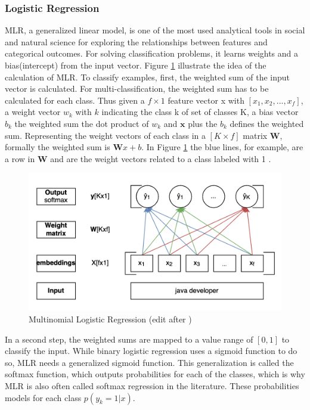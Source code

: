 \documentclass[12pt, a4paper, titlepage]{article}
\begin{document}
\subsubsection{Logistic Regression}
\ac{MLR}, a generalized linear model, is one of the most used analytical tools in social and natural science for exploring the relationships between features and categorical outcomes. For solving classification problems, it learns weights and a bias(intercept) from the input vector. Figure \ref{fig: F7} illustrate the idea of the calculation of \ac{MLR}. To classify examples, first, the weighted sum of the input vector is calculated. For multi-classification, the weighted sum has to be calculated for each class. Thus given a $f \times 1$ feature vector x with $[x_1, x_2, ..., x_f]$, a weight vector $w_k$ with $k$ indicating the class k of set of classes K, a bias vector $b_k$ the weighted sum the dot product of $w_k$ and $\textbf{x}$ plus the $b_k$ defines the weighted sum. Representing the weight vectors of each class in a $[K \times f]$ matrix $\textbf{W}$, formally the weighted sum is $\textbf{W}x+b$. In Figure \ref{fig: F7} the blue lines, for example, are a row in $\textbf{W}$ and are the weight vectors related to a class labeled with 1 \citep{jurafsky2021}.

\begin{figure}[hb!]
  \center
  \includegraphics[scale=0.5]{LR.png}
  \caption{\label{fig: F7} Multinomial Logistic Regression (edit after \citep[p.]{jurafsky2021})}
\end{figure}

In a second step, the weighted sums are mapped to a value range of $[0,1]$ to classify the input. While binary logistic regression uses a sigmoid function to do so, \ac{MLR} needs a generalized sigmoid function. This generalization is called the softmax function, which outputs probabilities for each of the classes, which is why \ac{MLR} is also often called softmax regression in the literature. These probabilities models for each class $p(y_k = 1|x)$.
\end{document}
